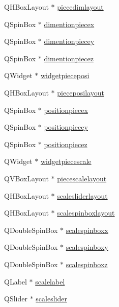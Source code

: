 \begin{DoxyCompactItemize}
\item 
Q\+H\+Box\+Layout $\ast$ \hyperlink{class_mondock_af9d31eb2800c5608dc9da41dcf1ca1d0}{piecedimlayout}
\item 
Q\+Spin\+Box $\ast$ \hyperlink{class_mondock_ab3829ab678beb2bc391bdb325b0beda1}{dimentionpiecex}
\item 
Q\+Spin\+Box $\ast$ \hyperlink{class_mondock_a60c16f4209470967b672f33a2c4fe67c}{dimentionpiecey}
\item 
Q\+Spin\+Box $\ast$ \hyperlink{class_mondock_ab9605a7a3ee01aec5f5b29fc111abdeb}{dimentionpiecez}
\item 
Q\+Widget $\ast$ \hyperlink{class_mondock_a960802e2aa94a22487ff03bbaa102a02}{widgetpieceposi}
\item 
Q\+H\+Box\+Layout $\ast$ \hyperlink{class_mondock_a676e96b53de7e8e4fd8f82c990b074df}{pieceposilayout}
\item 
Q\+Spin\+Box $\ast$ \hyperlink{class_mondock_ab93f251cb0119893cc7aadcd3ffb8eb1}{positionpiecex}
\item 
Q\+Spin\+Box $\ast$ \hyperlink{class_mondock_a82edda6549941e9c67700ed4562abba7}{positionpiecey}
\item 
Q\+Spin\+Box $\ast$ \hyperlink{class_mondock_ac4aa7f84daff43586674a324e0a69e24}{positionpiecez}
\item 
Q\+Widget $\ast$ \hyperlink{class_mondock_ac94f8cc2fda714079ee5a9ae363fe052}{widgetpiecescale}
\item 
Q\+V\+Box\+Layout $\ast$ \hyperlink{class_mondock_ae5f17873217894ff633f8dafc2907f9f}{piecescalelayout}
\item 
Q\+H\+Box\+Layout $\ast$ \hyperlink{class_mondock_a6a3248438048bf5db04e3e8b14a6fd3c}{scalesliderlayout}
\item 
Q\+H\+Box\+Layout $\ast$ \hyperlink{class_mondock_a3fdcf22d5b37219656eff1e9cf6973f8}{scalespinboxlayout}
\item 
Q\+Double\+Spin\+Box $\ast$ \hyperlink{class_mondock_a2f5f7e4641d0b15fc2c163667609fe04}{scalespinboxx}
\item 
Q\+Double\+Spin\+Box $\ast$ \hyperlink{class_mondock_a5659a916e3e6ca2e4f7b22610e903f8f}{scalespinboxy}
\item 
Q\+Double\+Spin\+Box $\ast$ \hyperlink{class_mondock_a218b1ecd2bf0e9d01622d1b46a55d460}{scalespinboxz}
\item 
Q\+Label $\ast$ \hyperlink{class_mondock_ad1002116acd630a0c97247a8459303c6}{scalelabel}
\item 
Q\+Slider $\ast$ \hyperlink{class_mondock_aeeaf93a255354e17ba515988712dd608}{scaleslider}

\end{DoxyCompactItemize}
